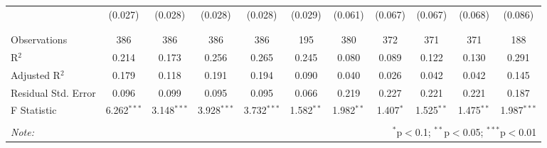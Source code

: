 \begin{table}[H]
\begin{tabular}{@{\extracolsep{4pt}}lcccccccccc}
  & (0.027) & (0.028) & (0.028) & (0.028) & (0.029) & (0.061) & (0.067) & (0.067) & (0.068) & (0.086) \\ 
  & & & & & & & & & & \\ 
\hline \\[-1.8ex] 
Observations & 386 & 386 & 386 & 386 & 195 & 380 & 372 & 371 & 371 & 188 \\ 
R$^{2}$ & 0.214 & 0.173 & 0.256 & 0.265 & 0.245 & 0.080 & 0.089 & 0.122 & 0.130 & 0.291 \\ 
Adjusted R$^{2}$ & 0.179 & 0.118 & 0.191 & 0.194 & 0.090 & 0.040 & 0.026 & 0.042 & 0.042 & 0.145 \\ 
Residual Std. Error & 0.096 & 0.099 & 0.095 & 0.095 & 0.066 & 0.219 & 0.227 & 0.221 & 0.221 & 0.187 \\ 
F Statistic & 6.262$^{***}$ & 3.148$^{***}$ & 3.928$^{***}$ & 3.732$^{***}$ & 1.582$^{**}$ & 1.982$^{**}$ & 1.407$^{*}$ & 1.525$^{**}$ & 1.475$^{**}$ & 1.987$^{***}$ \\ 
\hline 
\hline \\[-1.8ex] 
\textit{Note:}  & \multicolumn{10}{r}{$^{*}$p$<$0.1; $^{**}$p$<$0.05; $^{***}$p$<$0.01} \\ 
\end{tabular} 
\end{table} 
